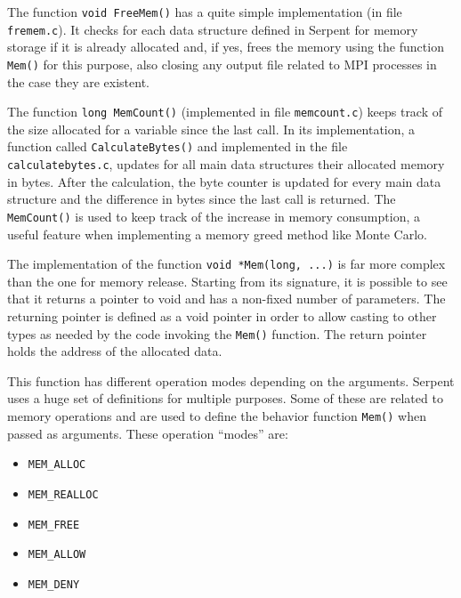 \documentclass[twoside,a4paper,12pt,english,draft]{anstrans}
\begin{document}
The function \texttt{void FreeMem()} has a quite simple implementation (in file \texttt{fremem.c}). It checks for each data structure
defined in Serpent for memory storage if it is already allocated and, if yes, frees the memory using
the function \texttt{Mem()} for this purpose, also closing any output file related to MPI processes
in the case they are existent.

The function \texttt{long MemCount()} (implemented in file \texttt{memcount.c}) keeps track
of the size allocated for a variable since the last
call. In its implementation, a function called \texttt{CalculateBytes()} and implemented in the file
\texttt{calculatebytes.c}, updates for all main data structures their allocated memory in bytes.
After the calculation, the byte counter is updated for every main data structure and the difference
in bytes since the last call is returned. The \texttt{MemCount()} is used to keep track of the increase
in memory consumption, a useful feature when implementing a memory greed method like Monte Carlo.

  

The implementation of the function \texttt{void *Mem(long, ...)} is far more complex than the one for
memory release. Starting from its signature, it is possible to see that it returns a pointer to void
and has a non-fixed number of parameters. The returning pointer is defined as a void pointer in order
to allow casting to other types as needed by the code invoking the \texttt{Mem()}
function. The return pointer holds the address of the allocated data.

This function has different operation modes depending on the arguments. Serpent uses a huge set of definitions for
multiple purposes. Some of these are related to memory operations and are used to define the behavior function \texttt{Mem()}
when passed as arguments. These operation ``modes'' are:


\begin{itemize}
\item \texttt{MEM\_ALLOC}
\item \texttt{MEM\_REALLOC}
\item \texttt{MEM\_FREE}
\item \texttt{MEM\_ALLOW}
\item \texttt{MEM\_DENY}
\end{itemize} 
\end{document}
